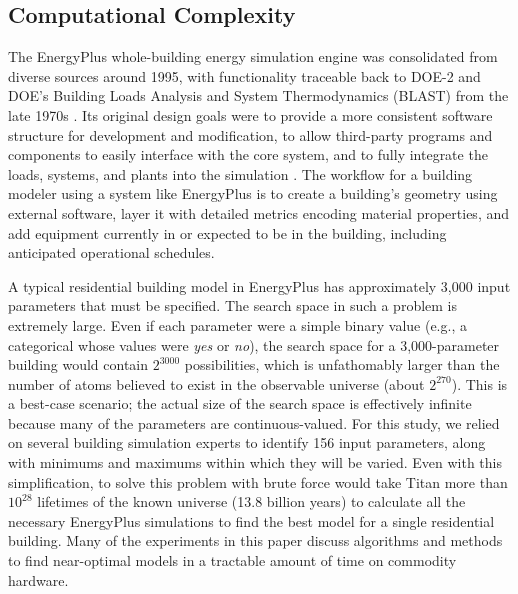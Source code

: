 \documentclass[preprint, review, 12pt]{elsarticle}
\begin{document}
\subsection{Computational Complexity}
The EnergyPlus whole-building energy simulation engine was consolidated from diverse sources around 1995, with functionality traceable back to DOE-2 and DOE's Building Loads Analysis and System Thermodynamics (BLAST) from the late 1970s \cite{cit:energyplus}. Its original design goals were to provide a more consistent software structure for development and modification, to allow third-party programs and components to easily interface with the core system, and to fully integrate the loads, systems, and plants into the simulation \cite{cit:energyplus}. The workflow for a building modeler using a system like EnergyPlus is to create a building's geometry using external software, layer it with detailed metrics encoding material properties, and add equipment currently in or expected to be in the building, including anticipated operational schedules.

A typical residential building model in EnergyPlus has approximately 3,000 input parameters that must be specified. The search space in such a problem is extremely large. Even if each parameter were a simple binary value (e.g., a categorical whose values were \emph{yes} or \emph{no}), the search space for a 3,000-parameter building would contain $2^{3000}$ possibilities, which is unfathomably larger than the number of atoms believed to exist in the observable universe (about $2^{270}$). This is a best-case scenario; the actual size of the search space is effectively infinite because many of the parameters are continuous-valued. For this study, we relied on several building simulation experts to identify 156 input parameters, along with minimums and maximums within which they will be varied. Even with this simplification, to solve this problem with brute force would take Titan more than $10^{28}$ lifetimes of the known universe (13.8 billion years) to calculate all the necessary EnergyPlus simulations to find the best model for a single residential building. Many of the experiments in this paper discuss algorithms and methods to find near-optimal models in a tractable amount of time on commodity hardware.
\end{document}
